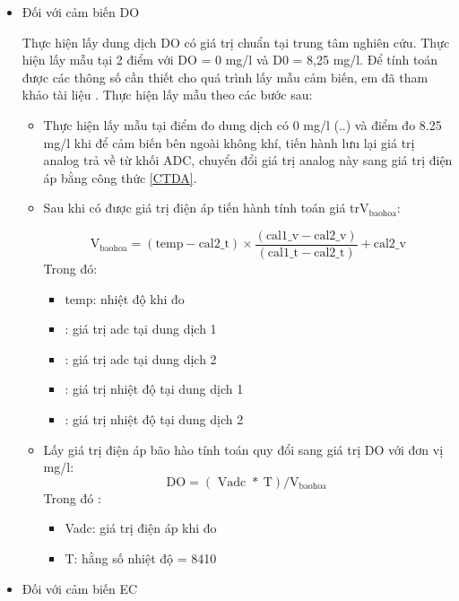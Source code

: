 \documentclass{article} %
\begin{document}
\begin{itemize}
\begin{itemize}[label=$\ast$]
		\end{itemize}
		\item Đối với cảm biến DO
		
		Thực hiện lấy dung dịch DO có giá trị chuẩn tại trung tâm nghiên cứu. Thực hiện lấy mẫu tại 2 điểm với DO = 0 mg/l và D0 = 8,25 mg/l. Để tính toán được các thông số cần thiết cho quá trình lấy mẫu cảm biến, em đã tham khảo tài liệu \cite{DODF}. Thực hiện lấy mẫu theo các bước sau:
		\begin{itemize}[label=$\ast$]
			\item Thực hiện lấy mẫu tại điểm đo dung dịch có 0 mg/l (..) và điểm đo 8.25 mg/l khi để cảm biến bên ngoài không khí, tiến hành lưu lại giá trị analog trả về từ khối ADC, chuyển đổi giá trị analog này sang giá trị điện áp bằng công thức \eqref{CTDA}.
			\item Sau khi có được giá trị điện áp tiến hành tính toán giá tr$\mathrm{V}_{\text {baohoa}}$:
			
			\begin{equation}
				\mathrm{V}_{\text{baohoa}} = (\text{temp} - \text{cal2\_t}) \times \frac{(\text{cal1\_v} - \text{cal2\_v})}{(\text{cal1\_t} - \text{cal2\_t})} + \text{cal2\_v}
			\end{equation}
			Trong đó:
			\begin{itemize}
				\item temp: nhiệt độ khi đo
				\item {}: giá trị adc tại dung dịch 1
				\item {}: giá trị adc tại dung dịch 2
				\item {}: giá trị nhiệt độ tại dung dịch 1
				\item {}: giá trị nhiệt độ tại dung dịch 2
			\end{itemize}
			
			\item Lấy giá trị điện áp bão hào tính toán quy đổi sang giá trị DO với đơn vị mg/l:
			\begin{equation}
				\mathrm{DO}=(\text { Vadc } * \mathrm{~T}) / \mathrm{V}_{\text {baohoa }}    
			\end{equation}
			Trong đó :
			\begin{itemize}
				\item Vadc: giá trị điện áp khi đo
				\item T: hằng số nhiệt độ = 8410
			\end{itemize}
			
		\end{itemize}
		\item Đối với cảm biến EC
		

\end{itemize}
\end{document}
